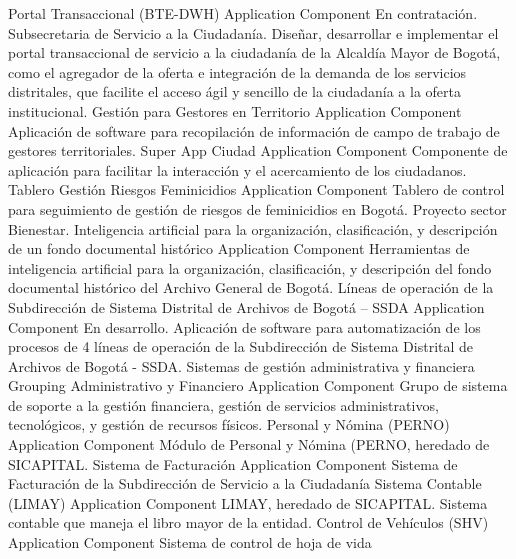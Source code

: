 \documentclass[
	a4paper, %
	12pt, %
]{include/CSSullivanBusinessReport}
\begin{document}
Portal Transaccional (BTE-DWH) \textbar{} Application Component
\textbar{} En contratación. Subsecretaria de Servicio a la Ciudadanía.
Diseñar, desarrollar e implementar el portal transaccional de servicio a
la ciudadanía de la Alcaldía Mayor de Bogotá, como el agregador de la
oferta e integración de la demanda de los servicios distritales, que
facilite el acceso ágil y sencillo de la ciudadanía a la oferta
institucional. \textbar{} \textbar{} Gestión para Gestores en Territorio
\textbar{} Application Component \textbar{} Aplicación de software para
recopilación de información de campo de trabajo de gestores
territoriales. \textbar{} \textbar{} Super App Ciudad \textbar{}
Application Component \textbar{} Componente de aplicación para facilitar
la interacción y el acercamiento de los ciudadanos. \textbar{}
\textbar{} Tablero Gestión Riesgos Feminicidios \textbar{} Application
Component \textbar{} Tablero de control para seguimiento de gestión de
riesgos de feminicidios en Bogotá. Proyecto sector Bienestar. \textbar{}
\textbar{} Inteligencia artificial para la organización, clasificación,
y descripción de un fondo documental histórico \textbar{} Application
Component \textbar{} Herramientas de inteligencia artificial para la
organización, clasificación, y descripción del fondo documental
histórico del Archivo General de Bogotá. \textbar{} \textbar{} Líneas de
operación de la Subdirección de Sistema Distrital de Archivos de Bogotá
-- SSDA \textbar{} Application Component \textbar{} En desarrollo.
Aplicación de software para automatización de los procesos de 4 líneas
de operación de la Subdirección de Sistema Distrital de Archivos de
Bogotá - SSDA. \textbar{} \textbar{} Sistemas de gestión administrativa
y financiera \textbar{} Grouping \textbar{} \textbar{} \textbar{}
Administrativo y Financiero \textbar{} Application Component \textbar{}
Grupo de sistema de soporte a la gestión financiera, gestión de
servicios administrativos, tecnológicos, y gestión de recursos físicos.
\textbar{} \textbar{} Personal y Nómina (PERNO) \textbar{} Application
Component \textbar{} Módulo de Personal y Nómina (PERNO, heredado de
SICAPITAL. \textbar{} \textbar{} Sistema de Facturación \textbar{}
Application Component \textbar{} Sistema de Facturación de la
Subdirección de Servicio a la Ciudadanía \textbar{} \textbar{} Sistema
Contable (LIMAY) \textbar{} Application Component \textbar{} LIMAY,
heredado de SICAPITAL. Sistema contable que maneja el libro mayor de la
entidad. \textbar{} \textbar{} Control de Vehículos (SHV) \textbar{}
Application Component \textbar{} Sistema de control de hoja de vida
\end{document}
